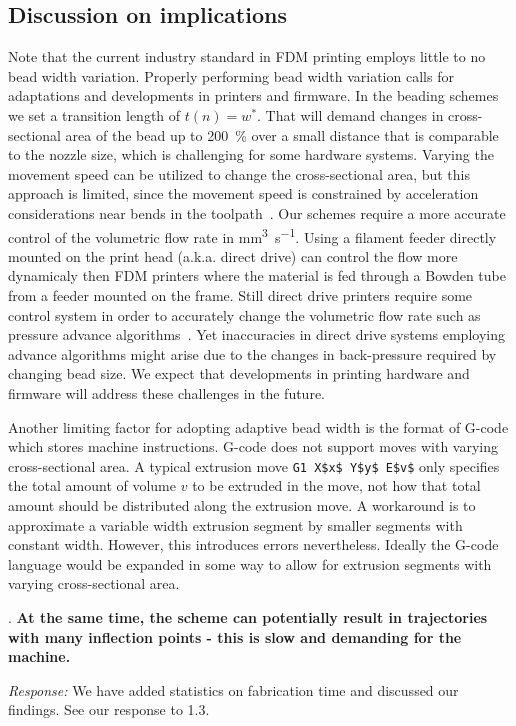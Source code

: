 \documentclass[5p,10pt,times]{elsarticle}
\theoremstyle{definition}
\newcommand\Que[1]{%
   \leavevmode\par
   \refstepcounter{question}
   \noindent
   \thequestion. {\bf#1}\par}
\newcounter{question}
\numberwithin{question}{section}
\newcommand\Ans[2][]{%
    \leavevmode\par\noindent
   {%
    {\it Response:} \textbf{#1}#2\par}}
\begin{document}
{{\subsection{Discussion on implications}
Note that the current industry standard in FDM printing employs little to no bead width variation.
Properly performing bead width variation calls for adaptations and developments in printers and firmware.
In the beading schemes we set a transition length of $t(n) = w^*$.
That will demand changes in cross-sectional area of the bead up to \SI{200}{\percent} over a small distance that is comparable to the nozzle size, which is challenging for some hardware systems.
Varying the movement speed can be utilized to change the cross-sectional area, but this approach is limited, since the movement speed is constrained by acceleration considerations near bends in the toolpath~\cite{Ertay2018,Kuipers2018}.
Our schemes require a more accurate control of the volumetric flow rate in \si{\milli\meter\cubed\per\second}.
Using a filament feeder directly mounted on the print head (a.k.a. direct drive) can control the flow more dynamicaly then FDM printers where the material is fed through a Bowden tube from a feeder mounted on the frame.
Still direct drive printers require some control system in order to accurately change the volumetric flow rate such as pressure advance algorithms~\cite{tronvoll2019investigating}.
Yet inaccuracies in direct drive systems employing advance algorithms might arise due to the changes in back-pressure required by changing bead size.
We expect that developments in printing hardware and firmware will address these challenges in the future.

Another limiting factor for adopting adaptive bead width is the format of G-code which stores machine instructions.
G-code does not support moves with varying cross-sectional area.
A typical extrusion move \lstinline!G1 X$x$ Y$y$ E$v$! only specifies the total amount of volume $v$ to be extruded in the move, not how that total amount should be distributed along the extrusion move.
A workaround is to approximate a variable width extrusion segment by smaller segments with constant width.
However, this introduces errors nevertheless.
Ideally the G-code language would be expanded in some way to allow for extrusion segments with varying cross-sectional area.
}{}
}




\Que{
At the same time, the scheme can potentially result in trajectories with many inflection points - this is slow and demanding for the machine. 
}
\Ans{
We have added statistics on fabrication time and discussed our findings.
See our response to 1.3.
}
\end{document}
